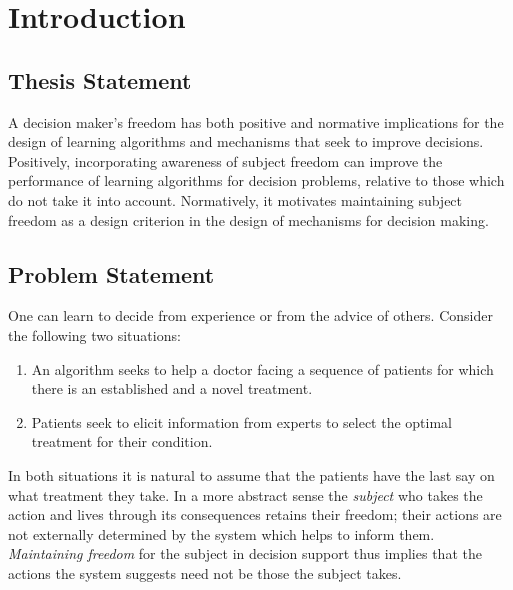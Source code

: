 \chapter{Introduction}
\label{cha:intro}



\section{Thesis Statement}
\label{sec:thesisstatement}

A decision maker's freedom has both positive and normative implications for the design of learning algorithms and mechanisms that seek to improve decisions.
Positively, incorporating awareness of subject freedom can improve the performance of learning algorithms for decision problems, relative to those which do not take it into account.
Normatively, it motivates maintaining subject freedom as a design criterion in the design of mechanisms for decision making.

\section{Problem Statement}
\label{sec:problemstatement}

One can learn to decide from experience or from the advice of others. Consider the following two situations:

\begin{enumerate}
	\item An algorithm seeks to help a doctor facing a sequence of patients for which there is an established and a novel treatment.
	\item Patients seek to elicit information from experts to select the optimal treatment for their condition.
\end{enumerate}

In both situations it is natural to assume that the patients have the last say on what treatment they take.
In a more abstract sense the \emph{subject} who takes the action and lives through its consequences retains their freedom; their actions are not externally determined by the system which helps to inform them.
\emph{Maintaining freedom} for the subject in decision support thus implies that the actions the system suggests need not be those the subject takes.


